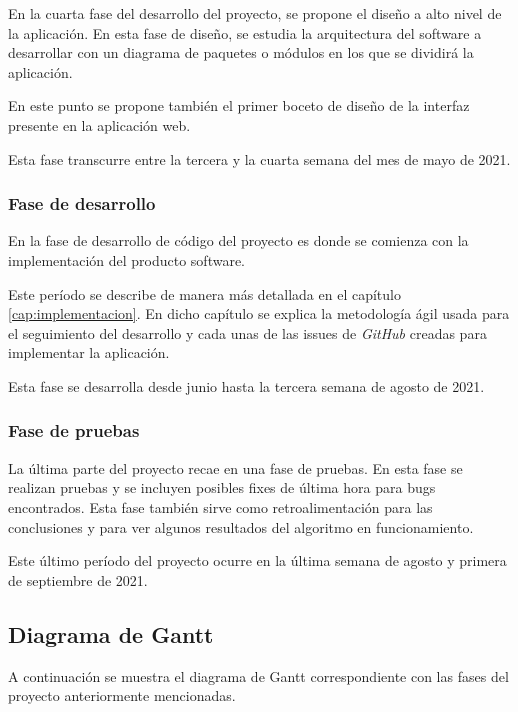 En la cuarta fase del desarrollo del proyecto, se propone el diseño a alto nivel de la aplicación. En esta fase de diseño, se estudia la arquitectura del software a desarrollar con un diagrama de paquetes o módulos en los que se dividirá la aplicación. \newline

En este punto se propone también el primer boceto de diseño de la interfaz presente en la aplicación web. \newline

Esta fase transcurre entre la tercera y la cuarta semana del mes de mayo de 2021.

\subsubsection{Fase de desarrollo}

En la fase de desarrollo de código del proyecto es donde se comienza con la implementación del producto software. \newline

Este período se describe de manera más detallada en el capítulo \ref{cap:implementacion}. En dicho capítulo se explica la metodología ágil usada para el seguimiento del desarrollo y cada unas de las issues de \textit{GitHub} creadas para implementar la aplicación. \newline

Esta fase se desarrolla desde junio hasta la tercera semana de agosto de 2021.

\subsubsection{Fase de pruebas}

La última parte del proyecto recae en una fase de pruebas. En esta fase se realizan pruebas y se incluyen posibles fixes de última hora para bugs encontrados. Esta fase también sirve como retroalimentación para las conclusiones y para ver algunos resultados del algoritmo en funcionamiento. \newline


Este último período del proyecto ocurre en la última semana de agosto y primera de septiembre de 2021.

\subsection{Diagrama de Gantt}

A continuación se muestra el diagrama de Gantt correspondiente con las fases del proyecto anteriormente mencionadas. \newline

